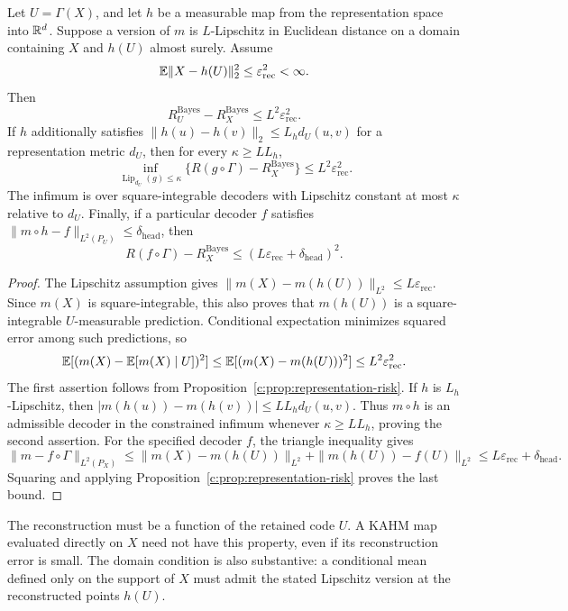 \begin{proposition}
\label{c:prop:reconstruction-bridge}
Let $U=\Gamma(X)$, and let $h$ be a measurable map from the representation
space into $\mathbb{R}^d$. Suppose a version of $m$ is $L$-Lipschitz in Euclidean
distance on a domain containing $X$ and $h(U)$ almost surely. Assume
\[
 \mathbb{E}\|X-h(U)\|_2^2\leq\varepsilon_{\mathrm{rec}}^2<\infty.
\]
Then
\[
 R_U^{\mathrm{Bayes}}-R_X^{\mathrm{Bayes}}
 \leq L^2\varepsilon_{\mathrm{rec}}^2.
\]
If $h$ additionally satisfies
$\|h(u)-h(v)\|_2\leq L_h d_U(u,v)$ for a representation metric $d_U$,
then for every $\kappa\geq LL_h$,
\[
 \inf_{\operatorname{Lip}_{d_U}(g)\leq\kappa}
 \{R(g\circ\Gamma)-R_X^{\mathrm{Bayes}}\}
 \leq L^2\varepsilon_{\mathrm{rec}}^2.
\]
The infimum is over square-integrable decoders with Lipschitz constant at
most $\kappa$ relative to $d_U$. Finally, if a particular decoder $f$
satisfies
$\|m\circ h-f\|_{L^2(P_U)}\leq\delta_{\mathrm{head}}$, then
\[
 R(f\circ\Gamma)-R_X^{\mathrm{Bayes}}
 \leq(L\varepsilon_{\mathrm{rec}}+\delta_{\mathrm{head}})^2.
\]
\end{proposition}
\begin{proof}
The Lipschitz assumption gives
$\|m(X)-m(h(U))\|_{L^2}\leq L\varepsilon_{\mathrm{rec}}$.
Since $m(X)$ is square-integrable, this also proves that $m(h(U))$ is
a square-integrable $U$-measurable prediction. Conditional expectation
minimizes squared error among such predictions, so
\[
 \mathbb{E}[(m(X)-\mathbb{E}[m(X)\mid U])^2]
 \leq\mathbb{E}[(m(X)-m(h(U)))^2]
 \leq L^2\varepsilon_{\mathrm{rec}}^2.
\]
The first assertion follows from
Proposition~\ref{c:prop:representation-risk}. If $h$ is $L_h$-Lipschitz,
then
$|m(h(u))-m(h(v))|\leq LL_h d_U(u,v)$.
Thus $m\circ h$ is an admissible decoder in the constrained infimum
whenever $\kappa\geq LL_h$, proving the second assertion. For the
specified decoder $f$, the triangle inequality gives
\[
 \|m-f\circ\Gamma\|_{L^2(P_X)}
 \leq\|m(X)-m(h(U))\|_{L^2}
      +\|m(h(U))-f(U)\|_{L^2}
 \leq L\varepsilon_{\mathrm{rec}}+\delta_{\mathrm{head}}.
\]
Squaring and applying Proposition~\ref{c:prop:representation-risk}
proves the last bound.
\end{proof}

The reconstruction must be a function of the retained code $U$. A KAHM
map evaluated directly on $X$ need not have this property, even if its
reconstruction error is small. The domain condition is also substantive:
a conditional mean defined only on the support of $X$ must admit the
stated Lipschitz version at the reconstructed points $h(U)$.

